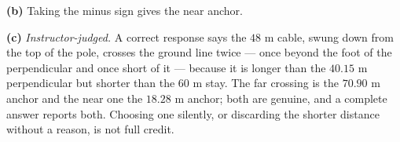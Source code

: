\documentclass[12pt]{article}
\begin{document}
\textbf{(b)} Taking the minus sign gives the near anchor. 

\textbf{(c)} \emph{Instructor-judged.} A correct response says the $48$ m cable, swung down from the top of the pole, crosses the ground line twice --- once beyond the foot of the perpendicular and once short of it --- because it is longer than the $40.15$ m perpendicular but shorter than the $60$ m stay. The far crossing is the $70.90$ m anchor and the near one the $18.28$ m anchor; both are genuine, and a complete answer reports both. Choosing one silently, or discarding the shorter distance without a reason, is not full credit.
\end{document}
